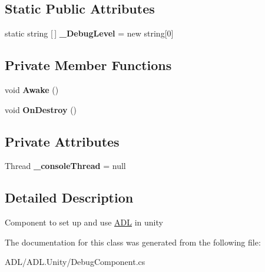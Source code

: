 \subsection*{Static Public Attributes}
\begin{DoxyCompactItemize}
\item 
\mbox{\label{class_a_d_l_1_1_unity_1_1_debug_component_aa23a2532fabf926cc33761d6891251ea}} 
static string \mbox{[}$\,$\mbox{]} {\bfseries \+\_\+\+Debug\+Level} = new string\mbox{[}0\mbox{]}
\end{DoxyCompactItemize}
\subsection*{Private Member Functions}
\begin{DoxyCompactItemize}
\item 
\mbox{\label{class_a_d_l_1_1_unity_1_1_debug_component_a510b193bc9c7db46b9a1b3cf38a25e18}} 
void {\bfseries Awake} ()
\item 
\mbox{\label{class_a_d_l_1_1_unity_1_1_debug_component_a482a448ac90c7502c94207b1baeab0ce}} 
void {\bfseries On\+Destroy} ()
\end{DoxyCompactItemize}
\subsection*{Private Attributes}
\begin{DoxyCompactItemize}
\item 
\mbox{\label{class_a_d_l_1_1_unity_1_1_debug_component_ae59c8a55238e3464fb9bb8b179bce3c2}} 
Thread {\bfseries \+\_\+console\+Thread} = null
\end{DoxyCompactItemize}


\subsection{Detailed Description}
Component to set up and use \mbox{\hyperlink{namespace_a_d_l}{A\+DL}} in unity 



The documentation for this class was generated from the following file\+:\begin{DoxyCompactItemize}
\item 
A\+D\+L/\+A\+D\+L.\+Unity/Debug\+Component.\+cs\end{DoxyCompactItemize}
